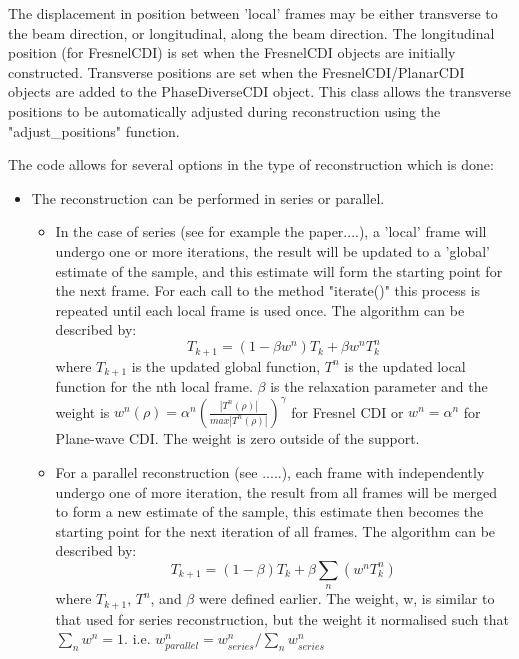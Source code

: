 \documentclass[]{nadia}
\begin{document}
The displacement in position between 'local' frames may be either
transverse to the beam direction, or longitudinal, along the beam
direction. The longitudinal position (for FresnelCDI) is set when the
FresnelCDI objects are initially constructed. Transverse positions are
set when the FresnelCDI/PlanarCDI objects are added to the
PhaseDiverseCDI object. This class allows the transverse positions to
be automatically adjusted during reconstruction using the
"adjust\_positions" function.

The code allows for several options in the type of reconstruction
which is done:

\begin{itemize}

  \item The reconstruction can be performed in series or parallel.
    \begin{itemize}

      \item In the case of series (see for example the paper....), a
	'local' frame will undergo one or more iterations, the result
	will be updated to a 'global' estimate of the sample, and this
	estimate will form the starting point for the next frame. For
	each call to the method "iterate()" this process is repeated
	until each local frame is used once. The algorithm can be
	described by:
	\[ T_{k+1} = (1-\beta w^n)T_k + \beta w^n T^n_k \] 
	where $T_{k+1}$ is the updated global function, $T^n$ is the
	updated local function for the nth local frame. $\beta$ is the
	relaxation parameter and the weight is $ w^n(\rho) = \alpha^n
	(\frac{|T^n(\rho)|}{max|T^n(\rho)|} )^\gamma $ for Fresnel CDI
	or $w^n = \alpha^n$ for Plane-wave CDI. The weight is zero
	outside of the support.

      \item For a parallel reconstruction (see .....), each frame with
	independently undergo one of more iteration, the result from all
	frames will be merged to form a new estimate of the sample, this
	estimate then becomes the starting point for the next iteration
	of all frames. The algorithm can be described by:
	\[T_{k+1} = (1-\beta)T_k + \beta \sum_n(w^n T^n_k)\]
	where $T_{k+1}$, $T^n$, and $\beta$ were defined
	earlier. The weight, w, is similar to that used for series
	reconstruction, but the weight it normalised such that 
	$ \sum_n w^n = 1 $.  i.e. $ w^n_{parallel}= w^n_{series} / \sum_n w^n_{series} $

    \end{itemize}


\end{itemize}
\end{document}
